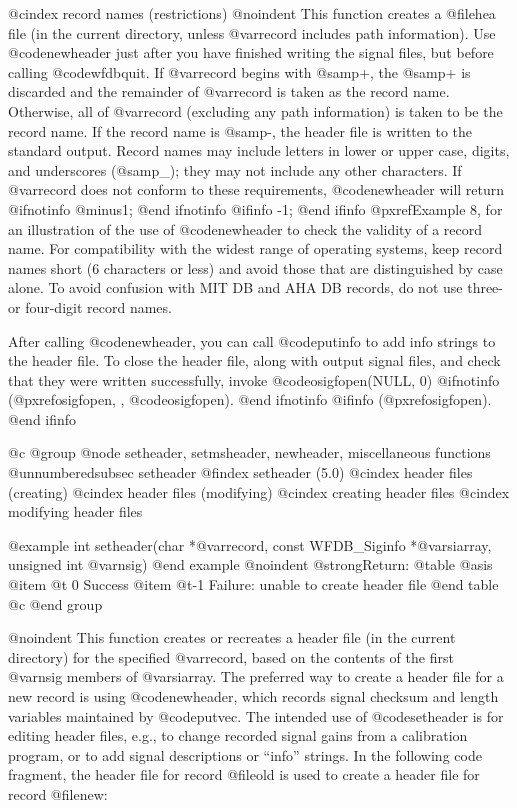 {{{{{{{{@cindex record names (restrictions)
@noindent
This function creates a @file{hea} file (in the current directory, unless
@var{record} includes path information).
Use @code{newheader} just after you have finished writing the signal
files, but before calling @code{wfdbquit}.  If @var{record} begins with
@samp{+}, the @samp{+} is discarded and the remainder of @var{record} is
taken as the record name.  Otherwise, all of @var{record} (excluding any
path information) is taken to be
the record name.  If the record name is @samp{-}, the header file
is written to the standard output.  Record names may include letters in
lower or upper case, digits, and underscores (@samp{_}); they may not
include any other characters.  If @var{record} does not conform to these
requirements, @code{newheader} will return
@ifnotinfo
@minus{}1;
@end ifnotinfo
@ifinfo
-1;
@end ifinfo
@pxref{Example 8},
for an illustration of the use of @code{newheader} to check the validity
of a record name.  For compatibility with the widest range of operating
systems, keep record names short (6 characters or less) and avoid those
that are distinguished by case alone.  To avoid confusion with MIT DB
and AHA DB records, do not use three- or four-digit record names.

After calling @code{newheader}, you can call @code{putinfo} to add info strings
to the header file.  To close the header file, along with output signal files,
and check that they were written successfully, invoke
@code{osigfopen(NULL, 0)}
@ifnotinfo
(@pxref{osigfopen, , @code{osigfopen}}).
@end ifnotinfo
@ifinfo
(@pxref{osigfopen}).
@end ifinfo

@c @group
@node     setheader, setmsheader, newheader, miscellaneous functions
@unnumberedsubsec setheader
@findex setheader (5.0)
@cindex header files (creating)
@cindex header files (modifying)
@cindex creating header files
@cindex modifying header files

@example
int setheader(char *@var{record}, const WFDB_Siginfo *@var{siarray},
              unsigned int @var{nsig})
@end example
@noindent
@strong{Return:}
@table @asis
@item @t{ 0}
Success
@item @t{-1}
Failure: unable to create header file
@end table
@c @end group

@noindent
This function creates or recreates a header file (in the current
directory) for the specified @var{record}, based on the contents of the
first @var{nsig} members of @var{siarray}.  The preferred way to create
a header file for a new record is using @code{newheader}, which records
signal checksum and length variables maintained by @code{putvec}.  The
intended use of @code{setheader} is for editing header files,
e.g., to change recorded signal gains from a calibration program, or to add
signal descriptions or ``info'' strings.  In the following code fragment, the
header file for record @file{old} is used to create a header file for
record @file{new}:

}}}}}}}}
